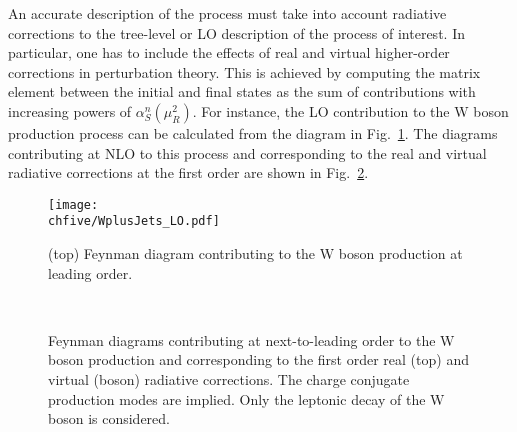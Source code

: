 An accurate description of the process must take into account radiative corrections to the tree-level or LO description of the process of interest.
In particular, one has to include the effects of real and virtual higher-order corrections in perturbation theory.
This is achieved by computing the matrix element between the initial and final states as the sum of contributions with increasing powers of $\alpha_S^n(\mu_R^2)$.
For instance, the LO contribution to the W boson production process can be calculated from the diagram in Fig.~\ref{fig:wjetsFD_LO}.
The diagrams contributing at NLO to this process and corresponding to the real and virtual radiative corrections at the first order are shown in Fig.~\ref{fig:wjetsFD_NLO}.\\

\begin{figure}[!htb]
\centering
\texttt{[image: \\chfive/WplusJets\_LO.pdf]}
\caption{(top) Feynman diagram contributing to the W boson production at leading order.}
\label{fig:wjetsFD_LO}
\end{figure}

\begin{figure}[!htb]
\centering
{}
\\
\caption{Feynman diagrams contributing at next-to-leading order to the W boson production and corresponding to the first order real (top) and virtual (boson) radiative corrections.
The charge conjugate production modes are implied. Only the leptonic decay of the W boson is considered.}
\label{fig:wjetsFD_NLO}
\end{figure}

